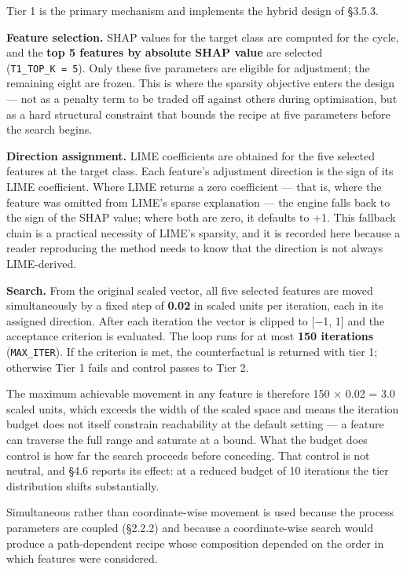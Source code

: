 Tier 1 is the primary mechanism and implements the hybrid design of §3.5.3.

\textbf{Feature selection.} SHAP values for the target class are computed for the cycle, and the \textbf{top 5 features by absolute SHAP value} are selected (\texttt{T1\_TOP\_K\ =\ 5}). Only these five parameters are eligible for adjustment; the remaining eight are frozen. This is where the sparsity objective enters the design --- not as a penalty term to be traded off against others during optimisation, but as a hard structural constraint that bounds the recipe at five parameters before the search begins.

\textbf{Direction assignment.} LIME coefficients are obtained for the five selected features at the target class. Each feature's adjustment direction is the sign of its LIME coefficient. Where LIME returns a zero coefficient --- that is, where the feature was omitted from LIME's sparse explanation --- the engine falls back to the sign of the SHAP value; where both are zero, it defaults to +1. This fallback chain is a practical necessity of LIME's sparsity, and it is recorded here because a reader reproducing the method needs to know that the direction is not always LIME-derived.

\textbf{Search.} From the original scaled vector, all five selected features are moved simultaneously by a fixed step of \textbf{0.02} in scaled units per iteration, each in its assigned direction. After each iteration the vector is clipped to {[}−1, 1{]} and the acceptance criterion is evaluated. The loop runs for at most \textbf{150 iterations} (\texttt{MAX\_ITER}). If the criterion is met, the counterfactual is returned with tier 1; otherwise Tier 1 fails and control passes to Tier 2.

The maximum achievable movement in any feature is therefore 150 × 0.02 = 3.0 scaled units, which exceeds the width of the scaled space and means the iteration budget does not itself constrain reachability at the default setting --- a feature can traverse the full range and saturate at a bound. What the budget does control is how far the search proceeds before conceding. That control is not neutral, and §4.6 reports its effect: at a reduced budget of 10 iterations the tier distribution shifts substantially.

Simultaneous rather than coordinate-wise movement is used because the process parameters are coupled (§2.2.2) and because a coordinate-wise search would produce a path-dependent recipe whose composition depended on the order in which features were considered.

